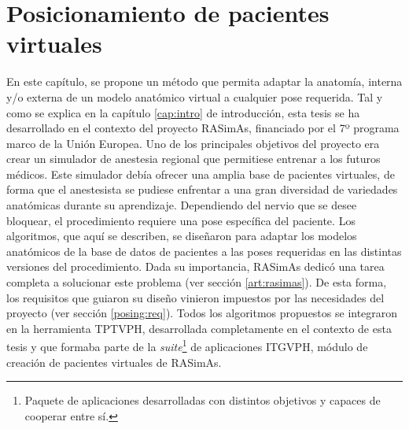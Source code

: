 \chapter{Posicionamiento de pacientes virtuales} 
\label{cap:posing}

En este capítulo, se propone un método que permita adaptar la anatomía, interna y/o externa de un modelo anatómico virtual a cualquier pose requerida. Tal y como se explica en la capítulo \ref{cap:intro} de introducción, esta tesis se ha desarrollado en el contexto del proyecto \ac{RASimAs}, financiado por el 7º programa marco de la Unión Europea. Uno de los principales objetivos del proyecto era crear un simulador de anestesia regional que permitiese entrenar a los futuros médicos.
Este simulador debía ofrecer una amplia base de pacientes virtuales, de forma que el anestesista se pudiese enfrentar a una gran diversidad de variedades anatómicas durante su aprendizaje. Dependiendo del nervio que se desee bloquear, el procedimiento requiere una pose específica del paciente. Los algoritmos, que aquí se describen, se diseñaron para adaptar los modelos anatómicos de la base de datos de pacientes a las poses requeridas en las distintas versiones del procedimiento. Dada su importancia, \ac{RASimAs} dedicó una tarea completa a solucionar este problema (ver sección \ref{art:rasimas}). 
De esta forma, los requisitos que guiaron su diseño vinieron impuestos por las necesidades del proyecto (ver sección \ref{posing:req}). Todos los algoritmos propuestos se integraron en la herramienta \ac{TPTVPH}, desarrollada completamente en el contexto de esta tesis y que formaba parte de la \emph{suite}\footnote{Paquete de aplicaciones desarrolladas con distintos objetivos y capaces de cooperar entre sí.} de aplicaciones \ac{ITGVPH}, módulo de creación de pacientes virtuales de  \ac{RASimAs}.



